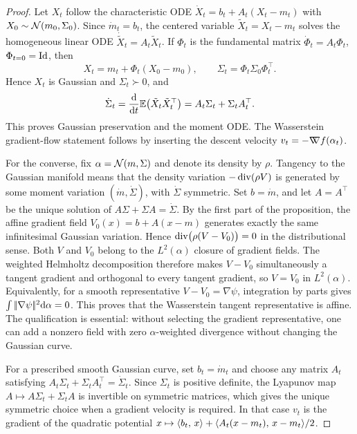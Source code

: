 \begin{proof}
	Let \(X_t\) follow the characteristic ODE \(\dot X_t=b_t+A_t(X_t-m_t)\) with \(X_0\sim\mathcal{N}(m_0,\Sigma_0)\). Since \(\dot m_t=b_t\), the centered variable \(\tilde X_t=X_t-m_t\) solves the homogeneous linear ODE \(\dot{\tilde X}_t=A_t\tilde X_t\). If \(\Phi_t\) is the fundamental matrix \(\dot\Phi_t=A_t\Phi_t\), \(\Phi_{t=0}=\mathrm{Id}\), then
	\[
		X_t=m_t+\Phi_t(X_0-m_0),
		\qquad
		\Sigma_t=\Phi_t\Sigma_0\Phi_t^\top.
	\]
	Hence \(X_t\) is Gaussian and \(\Sigma_t\succ0\), and
	\[
		\dot\Sigma_t
		=
		\frac{\mathrm{d}}{\mathrm{d} t}\mathbb{E}\bigl(\tilde X_t\tilde X_t^\top\bigr)
		=
		A_t\Sigma_t+\Sigma_t A_t^\top.
	\]
	This proves Gaussian preservation and the moment ODE\@. The Wasserstein gradient-flow statement follows by inserting the descent velocity $v_t=-\mathord{\nabla\mkern-9.3mu\nabla} f(\alpha_t)$.

	For the converse, fix $\alpha=\mathcal{N}(m,\Sigma)$ and denote its density by $\rho$. Tangency to the Gaussian manifold means that the density variation $-\operatorname{div}(\rho V)$ is generated by some moment variation $(\dot m,\dot\Sigma)$, with $\dot\Sigma$ symmetric. Set $b=\dot m$, and let $A=A^\top$ be the unique solution of
	\(A\Sigma+\Sigma A=\dot\Sigma\).
	By the first part of the proposition, the affine gradient field $V_0(x)=b+A(x-m)$ generates exactly the same infinitesimal Gaussian variation. Hence
	\(\operatorname{div}\bigl(\rho(V-V_0)\bigr)=0\)
	in the distributional sense. Both $V$ and $V_0$ belong to the $L^2(\alpha)$ closure of gradient fields. The weighted Helmholtz decomposition therefore makes $V-V_0$ simultaneously a tangent gradient and orthogonal to every tangent gradient, so $V=V_0$ in $L^2(\alpha)$. Equivalently, for a smooth representative $V-V_0=\nabla\psi$, integration by parts gives $\int|\!| \nabla\psi |\!|^2\mathrm{d}\alpha=0$. This proves that the Wasserstein tangent representative is affine. The qualification is essential: without selecting the gradient representative, one can add a nonzero field with zero $\alpha$-weighted divergence without changing the Gaussian curve.

	For a prescribed smooth Gaussian curve, set $b_t=\dot m_t$ and choose any matrix $A_t$ satisfying $A_t\Sigma_t+\Sigma_tA_t^\top=\dot\Sigma_t$. Since $\Sigma_t$ is positive definite, the Lyapunov map $A\mapsto A\Sigma_t+\Sigma_t A$ is invertible on symmetric matrices, which gives the unique symmetric choice when a gradient velocity is required. In that case $v_t$ is the gradient of the quadratic potential $x\mapsto \langle b_t,\,x\rangle+\langle A_t(x-m_t),\,x-m_t\rangle/2$.
\end{proof}

